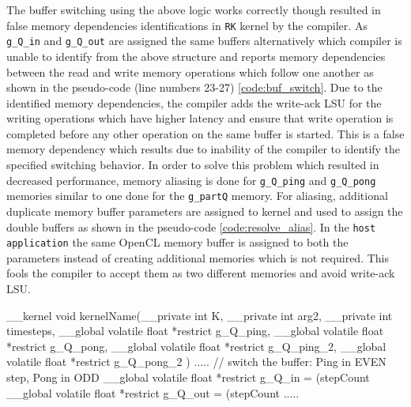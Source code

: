 The buffer switching using the above logic works correctly though resulted in false memory
dependencies identifications in \texttt{RK} kernel by the compiler. As \texttt{g\_Q\_in} and
\texttt{g\_Q\_out} are assigned the same buffers alternatively which compiler is unable to
identify from the above structure and reports memory dependencies between the read and write
memory operations which follow one another as shown in the pseudo-code (line numbers 23-27) \ref{code:buf_switch}.
Due to the identified memory dependencies, the compiler adds the write-ack LSU for the writing
operations which have higher latency and ensure that write operation is completed before
any other operation on the same buffer is started. This is a false memory dependency which
results due to inability of the compiler to identify the specified switching behavior.
In order to solve this problem which resulted in decreased performance, memory aliasing
is done for \texttt{g\_Q\_ping} and \texttt{g\_Q\_pong} memories similar to one done for the
\texttt{g\_partQ} memory. For aliasing, additional duplicate memory buffer parameters are
assigned to kernel and used to assign the double buffers as shown in the pseudo-code \ref{code:resolve_alias}.
In the \texttt{host application} the same OpenCL memory buffer is assigned to both the parameters instead of creating
additional memories which is not required. This fools the compiler to accept them as two different
memories and avoid write-ack LSU.
\begin{CppCode}[caption=Aliasing of the \texttt{g\_Q\_xx} buffer to avoid memory dependencies
    identified by the Intel OpenCL compiler, frame=tlrb, label=code:resolve_alias, float]
__kernel void kernelName(__private int K,  __private int arg2, __private int timesteps,
                        __global volatile float  *restrict g_Q_ping,
                        __global volatile float  *restrict g_Q_pong,
                        __global volatile float  *restrict g_Q_ping_2,
                        __global volatile float  *restrict g_Q_pong_2
                        )
{
.....
    // switch the buffer: Ping in EVEN step, Pong in ODD
    __global volatile float *restrict g_Q_in = (stepCount%
    __global volatile float *restrict g_Q_out = (stepCount%
.....
}
\end{CppCode}

